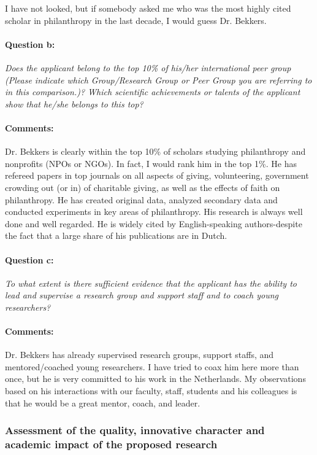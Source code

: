 \documentclass[twocolumn, serif, rga, numeric]{jote-article}
\begin{document}
I have not looked, but if somebody asked me who was the most highly cited scholar in philanthropy in the last decade, I would guess Dr. Bekkers.
\paragraph{Question b:}
\textit{Does the applicant belong to the top 10\% of his/her international peer group (Please indicate which Group/Research Group or Peer Group you are referring to in this comparison.)? Which scientific achievements or talents of the applicant show that he/she belongs to this top?}
\paragraph{Comments:}
Dr. Bekkers is clearly within the top 10\% of scholars studying philanthropy and nonprofits (NPOs or NGOs). In fact, I would rank him in the top 1\%. He has refereed papers in top journals on all aspects of giving, volunteering, government crowding out (or in) of charitable giving, as well as the effects of faith on philanthropy. He has created original data, analyzed secondary data and conducted experiments in key areas of philanthropy. His research is always well done and well regarded. He is widely cited by English-speaking authors-despite the fact that a large share of his publications are in Dutch.
\paragraph{Question c:}
\textit{To what extent is there sufficient evidence that the applicant has the ability to lead and supervise a research group and support staff and to coach young researchers?}
\paragraph{Comments:}
Dr. Bekkers has already supervised research groups, support staffs, and mentored/coached young researchers. I have tried to coax him here more than once, but he is very committed to his work in the Netherlands. My observations based on his interactions with our faculty, staff, students and his colleagues is that he would be a great mentor, coach, and leader.
 {}\subsubsection*{Assessment of the quality, innovative character and academic impact of the proposed research} 
\end{document}
